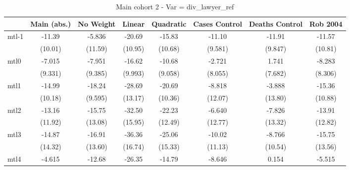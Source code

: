 \documentclass{article}
\begin{document}
{
\def\sym#1{\ifmmode^{#1}\else\(^{#1}\)\fi}
\begin{longtable}{l*{7}{c}}
\caption{Main cohort 2 - Var = div\_lawyer\_ref}\\
\hline\hline\endfirsthead\hline\endhead\hline\endfoot\endlastfoot
                &\multicolumn{1}{c}{Main (abs.)}&\multicolumn{1}{c}{No Weight}&\multicolumn{1}{c}{Linear}&\multicolumn{1}{c}{Quadratic}&\multicolumn{1}{c}{Cases Control}&\multicolumn{1}{c}{Deaths Control}&\multicolumn{1}{c}{Rob 2004}\\
\hline
mtl-1           &   -11.39         &   -5.836         &   -20.69         &   -15.83         &   -11.10         &   -11.91         &   -11.57         \\
                &  (10.01)         &  (11.59)         &  (10.95)         &  (10.68)         &  (9.581)         &  (9.847)         &  (10.81)         \\
mtl0            &   -7.015         &   -7.951         &   -16.62         &   -10.68         &   -2.721         &    1.741         &   -8.283         \\
                &  (9.331)         &  (9.385)         &  (9.993)         &  (9.058)         &  (8.055)         &  (7.682)         &  (8.306)         \\
mtl1            &   -14.99         &   -18.24         &   -28.69         &   -20.69         &   -8.818         &   -3.888         &   -15.36         \\
                &  (10.18)         &  (9.595)         &  (13.17)         &  (10.36)         &  (12.07)         &  (13.80)         &  (10.88)         \\
mtl2            &   -13.16         &   -15.75         &   -32.50         &   -22.23         &   -6.640         &   -7.826         &   -13.91         \\
                &  (11.92)         &  (13.08)         &  (15.95)         &  (12.49)         &  (12.77)         &  (13.32)         &  (12.82)         \\
mtl3            &   -14.87         &   -16.91         &   -36.36         &   -25.06         &   -10.02         &   -8.766         &   -15.75         \\
                &  (14.32)         &  (13.60)         &  (16.74)         &  (15.33)         &  (11.13)         &  (10.54)         &  (13.56)         \\
mtl4            &   -4.615         &   -12.68         &   -26.35         &   -14.79         &   -8.646         &    0.154         &   -5.515         \\

\end{longtable}}
\end{document}
